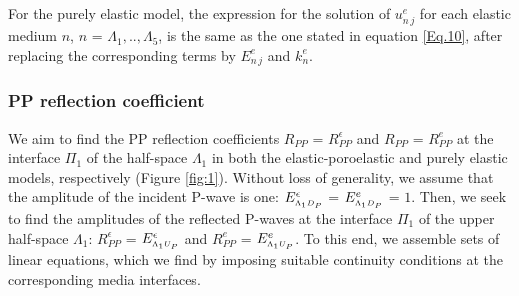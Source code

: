 \documentclass[draft]{agujournal2019}
\begin{document}
For the purely elastic model, the expression for the solution of $u_{n\,j}^e$ for each elastic medium $n$, $n$ = $\Lambda_1,.., \Lambda_5$, is the same as the one stated in equation \eqref{Eq.10}, after replacing the corresponding terms by $E_{n \,j}^e$ and $k_{n}^e$.

\subsubsection{PP reflection coefficient}

We aim to find the PP reflection coefficients $R_{PP}$ = $R_{PP}^\epsilon$ and $R_{PP}$ = $R_{PP}^e$  at the interface  $\Pi_1$ of the half-space $\Lambda_1$ in both the elastic-poroelastic and purely elastic models, respectively (Figure \ref{fig:1}). Without loss of generality, we assume that the amplitude of the incident P-wave is one:
$ \tensor*[]{E}{*^\epsilon_{\text{\tiny $\Lambda_1$}}_{ \text{\tiny $D_P$}}}$ =  $\tensor*[]{E}{*^e_{\text{\tiny $\Lambda_1$}}_{\text{\tiny $D_P$}}}$ = $1$.
Then, we seek to find the amplitudes of the reflected P-waves at the interface $\Pi_1$ of the upper half-space $\Lambda_1$: $R_{PP}^\epsilon$ = $ \tensor*[]{E}{*^\epsilon_{\text{\tiny $\Lambda_1$}}_{ \text{\tiny $U_P$}}}$ and 
$R_{PP}^e$ = $\tensor*[]{E}{*^e_{\text{\tiny $\Lambda_1$}}_{\text{\tiny $U_P$}}}$.
To this end,
we assemble sets of linear equations, which we find by imposing suitable continuity conditions at the corresponding media interfaces.
\end{document}
